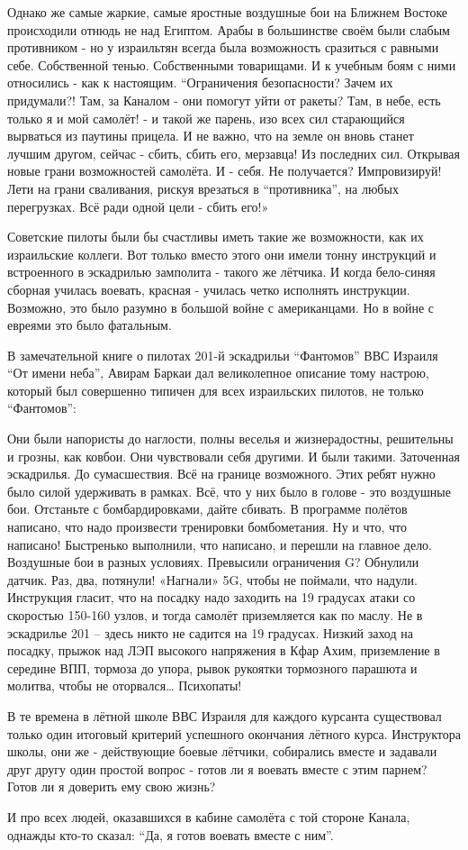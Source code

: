 Однако же самые жаркие, самые яростные воздушные бои на Ближнем Востоке происходили отнюдь не над Египтом. Арабы в большинстве своём были слабым противником - но у израильтян всегда была возможность сразиться с равными себе. Собственной тенью. Собственными товарищами. И к учебным боям с ними относились - как к настоящим. “Ограничения безопасности? Зачем их придумали?! Там, за Каналом - они помогут уйти от ракеты? Там, в небе, есть только я и мой самолёт! - и такой же парень, изо всех сил старающийся вырваться из паутины прицела. И не важно, что на земле он вновь станет лучшим другом, сейчас - сбить, сбить его, мерзавца! Из последних сил. Открывая новые грани возможностей самолёта. И - себя. Не получается? Импровизируй! Лети на грани сваливания, рискуя врезаться в “противника”, на любых перегрузках. Всё ради одной цели - сбить его!»

Советские пилоты были бы счастливы иметь такие же возможности, как их израильские коллеги. Вот только вместо этого они имели тонну инструкций и встроенного в эскадрилью замполита - такого же лётчика. И когда бело-синяя сборная училась воевать, красная - училась четко исполнять инструкции. Возможно, это было разумно в большой войне с американцами. Но в войне с евреями это было фатальным.

В замечательной книге о пилотах 201-й эскадрильи “Фантомов” ВВС Израиля “От имени неба”, Авирам Баркаи дал великолепное описание тому настрою, который был совершенно типичен для всех израильских пилотов, не только “Фантомов”:

\begin{textcitation}
	Они были напористы до наглости, полны веселья и жизнерадостны, решительны и грозны, как ковбои. Они чувствовали себя другими. И были такими. Заточенная эскадрилья. До сумасшествия. Всё на границе возможного. Этих ребят нужно было силой удерживать в рамках. Всё, что у них было в голове - это воздушные бои. Отстаньте с бомбардировками, дайте сбивать. В программе полётов написано, что надо произвести тренировки бомбометания. Ну и что, что написано! Быстренько выполнили, что написано, и перешли на главное дело. Воздушные бои в разных условиях. Превысили ограничения G? Обнулили датчик. Раз, два, потянули! «Нагнали» 5G, чтобы не поймали, что надули. Инструкция гласит, что на посадку надо заходить на 19 градусах атаки со скоростью 150-160 узлов, и тогда самолёт приземляется как по маслу. Не в эскадрилье 201 – здесь никто не садится на 19 градусах. Низкий заход на посадку, прыжок над ЛЭП высокого напряжения в Кфар Ахим, приземление в середине ВПП, тормоза до упора, рывок рукоятки тормозного парашюта и молитва, чтобы не оторвался… Психопаты!
\end{textcitation}

В те времена в лётной школе ВВС Израиля для каждого курсанта существовал только один итоговый критерий успешного окончания лётного курса. Инструктора школы, они же - действующие боевые лётчики, собирались вместе и задавали друг другу один простой вопрос - готов ли я воевать вместе с этим парнем? Готов ли я доверить ему свою жизнь?

И про всех людей, оказавшихся в кабине самолёта с той стороне Канала, однажды кто-то сказал: “Да, я готов воевать вместе с ним”.
